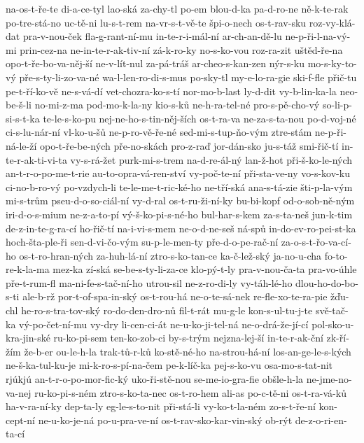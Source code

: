 {na-os-t-ře-te
di-a-ce-tyl
lao-ská
za-chy-tl
po-em
blou-d-ka
pa-d-ro-ne
ně-k-te-rak
po-tre-stá-no
uc-tě-ni
lu-s-t-rem
na-vr-s-t-vě-te
špi-o-nech
os-t-rav-sku
roz-vy-klá-dat
pra-v-nou-ček
fla-g-rant-ní-mu
in-te-r-i-mál-ní
ar-ch-an-dě-lu
ne-p-ři-l-na-vý-mi
prin-cez-na
ne-in-te-r-ak-tiv-ní
zá-k-ro-ky
no-s-ko-vou
roz-ra-zit
uštěd-ře-na
opo-t-ře-bo-va-něj-ší
ne-v-lít-nul
za-pá-tráš
ar-cheo-s-kan-zen
nýr-s-ku
mo-s-ky-to-vý
pře-s-ty-li-zo-va-né
wa-l-len-ro-di-s-mus
po-sky-tl
my-e-lo-ra-gie
ski-f-fle
přič-tu
pe-t-ří-ko-vě
ne-s-vá-dí
vet-chozra-ko-s-tí
nor-mo-b-last
ly-d-dit
vy-b-lin-ka-la
neo-be-š-li
no-mi-z-ma
pod-mo-k-la-ny
kio-s-ků
ne-h-ra-tel-né
pro-s-pě-cho-vý
so-li-p-si-s-t-ka
te-le-s-ko-pu
nej-ne-ho-s-tin-něj-ších
os-t-ra-va
ne-za-s-ta-nou
po-d-voj-né
ci-s-lu-nár-ní
vl-ko-u-šů
ne-p-ro-vě-ře-né
sed-mi-s-tup-ňo-vým
ztre-stám
ne-p-ři-ná-le-ží
opo-t-ře-be-ných
pře-no-skách
pro-z-raď
jor-dán-sko
ju-s-táž
smi-řič-tí
in-te-r-ak-ti-vi-ta
vy-s-rá-žet
purk-mi-s-trem
na-d-re-ál-ný
lan-ž-hot
při-š-ko-le-ných
an-t-r-o-po-me-t-rie
au-to-opra-vá-ren-ství
vy-poč-te-ní
při-sta-ve-ny
vo-s-kov-ku
ci-no-b-ro-vý
po-vzdych-li
te-le-me-t-ric-ké-ho
ne-tří-ská
ana-s-tá-zie
šti-p-la-vým
mi-s-trům
pseu-d-o-so-ciál-ní
vy-d-ral
os-t-ru-ži-ní-ky
bu-bi-kopf
od-o-sob-ně-ným
iri-d-o-s-mium
ne-z-a-to-pí
vý-š-ko-pi-s-né-ho
bul-har-s-kem
za-s-ta-neš
jun-k-tim
de-z-in-te-g-ra-cí
ho-řič-tí
na-i-vi-s-mem
ne-o-d-ne-seš
ná-spů
in-do-ev-ro-pei-st-ka
hoch-šta-ple-ři
sen-d-vi-čo-vým
su-p-le-men-ty
pře-d-o-pe-rač-ní
za-o-s-t-řo-va-cí-ho
os-t-ro-hran-ných
za-huh-lá-ní
ztro-s-ko-tan-ce
ka-č-lež-ský
ja-no-u-cha
fo-to-re-k-la-ma
mez-ka
zí-ská
se-be-s-ty-li-za-ce
klo-pý-t-ly
pra-v-nou-ča-ta
pra-vo-úhle
pře-t-rum-fl
ma-ni-fe-s-tač-ní-ho
utrou-sil
ne-z-ro-di-ly
vy-táh-lé-ho
dlou-ho-do-bo-s-ti
ale-b-rž
por-t-of-spa-in-ský
os-t-rou-há
ne-o-te-sá-nek
re-fle-xo-te-ra-pie
žďu-chl
he-ro-s-tra-tov-ský
ro-do-den-dro-nů
fil-t-rát
mu-g-le
kon-s-ul-tu-j-te
svě-tač-ka
vý-po-čet-ní-mu
vy-dry
li-cen-ci-át
ne-u-ko-ji-tel-ná
ne-o-drá-že-jí-cí
pol-sko-u-kra-jin-ské
ru-ko-pi-sem
ten-ko-zob-ci
by-s-trým
nejzna-lej-ší
in-te-r-ak-ční
zk-ří-žím
že-b-er
ou-le-h-la
trak-tů-r-ků
ko-stě-né-ho
na-strou-há-ní
los-an-ge-le-s-kých
ne-š-ka-tul-ku-je
mi-k-ro-s-pí-na-čem
pe-k-líč-ka
pej-s-ko-vu
osa-mo-s-tat-nit
rjúkjú
an-t-r-o-po-mor-fic-ký
uko-ři-stě-nou
se-me-io-gra-fie
obšle-h-la
ne-jme-no-va-nej
ru-ko-pi-s-ném
ztro-s-ko-ta-nec
os-t-ro-hem
ali-as
po-c-tě-ni
os-t-ra-vá-ků
ha-v-ra-ní-ky
dep-ta-ly
eg-le-s-to-nit
při-stá-li
vy-ko-t-la-ném
zo-s-t-ře-ní
kon-cept-ní
ne-u-ko-je-ná
po-u-pra-ve-ní
os-t-rav-sko-kar-vin-ský
ob-rýt
de-z-o-ri-en-ta-cí
}
